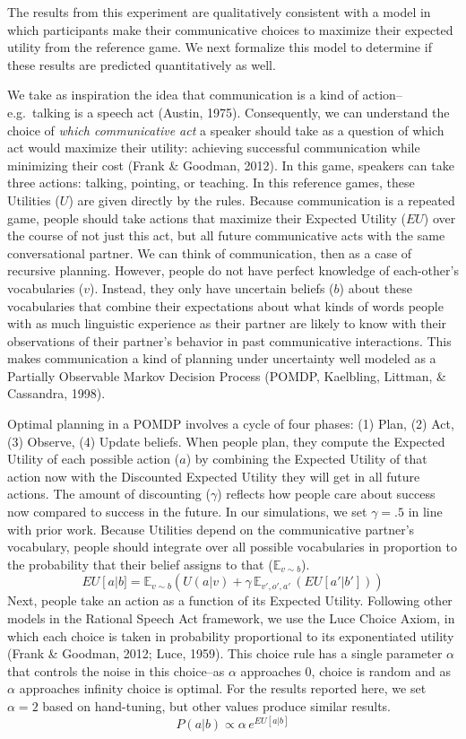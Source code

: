 \documentclass[10pt, letterpaper]{article}
\begin{document}
The results from this experiment are qualitatively consistent with a
model in which participants make their communicative choices to maximize
their expected utility from the reference game. We next formalize this
model to determine if these results are predicted quantitatively as
well.

\newcommand{\E}[1]{\mathbb{E}\left[ #1 \right]}

We take as inspiration the idea that communication is a kind of
action--e.g.~talking is a speech act (Austin, 1975). Consequently, we
can understand the choice of \emph{which communicative act} a speaker
should take as a question of which act would maximize their utility:
achieving successful communication while minimizing their cost (Frank \&
Goodman, 2012). In this game, speakers can take three actions: talking,
pointing, or teaching. In this reference games, these Utilities (\(U\))
are given directly by the rules. Because communication is a repeated
game, people should take actions that maximize their Expected Utility
(\(EU\)) over the course of not just this act, but all future
communicative acts with the same conversational partner. We can think of
communication, then as a case of recursive planning. However, people do
not have perfect knowledge of each-other's vocabularies (\(v\)).
Instead, they only have uncertain beliefs (\(b\)) about these
vocabularies that combine their expectations about what kinds of words
people with as much linguistic experience as their partner are likely to
know with their observations of their partner's behavior in past
communicative interactions. This makes communication a kind of planning
under uncertainty well modeled as a Partially Observable Markov Decision
Process (POMDP, Kaelbling, Littman, \& Cassandra, 1998).

Optimal planning in a POMDP involves a cycle of four phases: (1) Plan,
(2) Act, (3) Observe, (4) Update beliefs. When people plan, they compute
the Expected Utility of each possible action (\(a\)) by combining the
Expected Utility of that action now with the Discounted Expected Utility
they will get in all future actions. The amount of discounting
(\(\gamma\)) reflects how people care about success now compared to
success in the future. In our simulations, we set \(\gamma=.5\) in line
with prior work. Because Utilities depend on the communicative partner's
vocabulary, people should integrate over all possible vocabularies in
proportion to the probability that their belief assigns to that
(\(\mathbb{E}_{v \sim b}\)). \[
EU\left[a\right | b] = \mathbb{E}_{v \sim b} \left(U(a|v) + \gamma \,\mathbb{E}_{v',o',a'} \,\left( EU\left[a' | b'\right]\right)\right)
\] Next, people take an action as a function of its Expected Utility.
Following other models in the Rational Speech Act framework, we use the
Luce Choice Axiom, in which each choice is taken in probability
proportional to its exponentiated utility (Frank \& Goodman, 2012; Luce,
1959). This choice rule has a single parameter \(\alpha\) that controls
the noise in this choice--as \(\alpha\) approaches 0, choice is random
and as \(\alpha\) approaches infinity choice is optimal. For the results
reported here, we set \(\alpha = 2\) based on hand-tuning, but other
values produce similar results. \[ 
P\left(a|b\right) \propto \alpha \, e^{EU[a|b]}
\]
\end{document}

